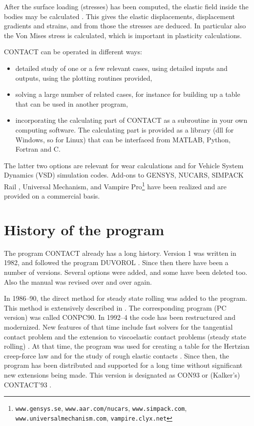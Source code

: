 \documentclass[12pt]{report}
\begin{document}
After the surface loading (stresses) has been computed, the elastic field
inside the bodies may be calculated \cite{Kalker1986a,Wekken2019a-subsurf}.
This gives the elastic displacements, displacement gradients and strains,
and from those the stresses are deduced. In particular also the Von Mises
stress is calculated, which is important in plasticity calculations.

CONTACT can be operated in different ways:
\begin{itemize}
\item detailed study of one or a few relevant cases, using detailed inputs
        and outputs, using the plotting routines provided,
\item solving a large number of related cases, for instance for building up
        a table that can be used in another program,
\item incorporating the calculating part of CONTACT as a subroutine in your
        own computing software. The calculating part is provided as a
        library (dll for Windows, so for Linux) that can be interfaced from
        MATLAB, Python, Fortran and C.
\end{itemize}
The latter two options are relevant for wear calculations and for Vehicle
System Dynamics (VSD) simulation codes. Add-ons to GENSYS, NUCARS, SIMPACK
Rail \cite{Vollebregt2024b-railways,memo24004-simpack-usub}, 
Universal Mechanism, and Vampire Pro\footnote{{\tt www.gensys.se}, 
{\tt www.aar.com/nucars}, {\tt www.simpack.com}, 
{\tt www.universalmechanism.com}, {\tt vampire.\-clyx.net}} have been realized
and are provided on a commercial basis.

\section{History of the program}

The program CONTACT already has a long history. Version 1 was written in
1982, and followed the program DUVOROL \cite{Kalker1979a,Tsjoeng1980}. Since
then there have been a number of versions. Several options were added, and
some have been deleted too. Also the manual was revised over and over again.

In 1986--90, the direct method for steady state rolling was added to the
program. This method is extensively described in \cite{Kalker1990}. The
corresponding program (PC version) was called CONPC90. In 1992--4 the code
has been restructured and modernized.  New features of that time include
fast solvers for the tangential contact problem
\cite{Vollebregt1995a-convexgs} and the extension to viscoelastic contact
problems (steady state rolling)
\cite{Wang_guangqiu1992b,Wang_guangqiu1993}. At that time, the program was
used for creating a table for the Hertzian creep-force law
\cite{Kalker1996b-usetab} and for the study of rough elastic contacts
\cite{Kalker1997}. Since then, the program has been distributed and
supported for a long time without significant new extensions being made.
This version is designated as CON93 or (Kalker's) CONTACT'93
\cite{Vollebregt1993f-con93}.
\end{document}
